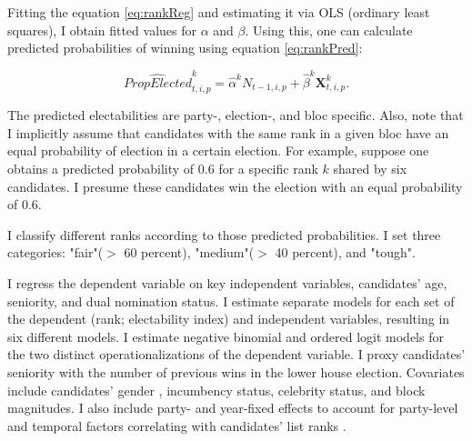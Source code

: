 \documentclass[a4paper, 12pt]{article}
\begin{document}

Fitting the equation \ref{eq:rankReg} and estimating it via OLS (ordinary least squares), I obtain fitted values for $\alpha$ and $\beta$. Using this, one can calculate predicted probabilities of winning using equation \ref{eq:rankPred}: 

\begin{equation} \label{eq:rankPred}
\hat{PropElected}^k_{t, i, p} = \hat\alpha^k N_{t-1, i, p} + \hat\beta^k \mathbf{X}^k_{t, i, p}.
\end{equation}

\noindent The predicted electabilities are party-, election-, and bloc specific. Also, note that I implicitly assume that candidates with the same rank in a given bloc have an equal probability of election in a certain election. For example, suppose one obtains a predicted probability of $0.6$ for a specific rank $k$ shared by six candidates. I presume these candidates win the election with an equal probability of $0.6$.

I classify different ranks according to those predicted probabilities. I set three categories: "fair"($>$ 60 percent), "medium"($>$ 40 percent), and "tough".

I regress the dependent variable on key independent variables, candidates' age, seniority, and dual nomination status. I estimate separate models for each set of the dependent (rank; electability index) and independent variables, resulting in six different models. I estimate negative binomial and ordered logit models for the two distinct operationalizations of the dependent variable. I proxy candidates' seniority with the number of previous wins in the lower house election. Covariates include candidates' gender \citep{chiru2017value, salmond2006proportional}, incumbency status, celebrity status, and block magnitudes. I also include party- and year-fixed effects to account for party-level and temporal factors correlating with candidates' list ranks \citep{fujimura2012position}.
\end{document}
